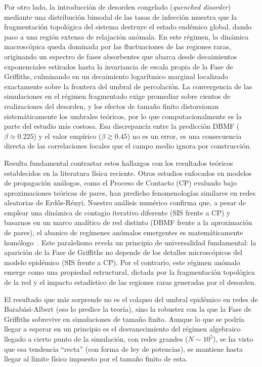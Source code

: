 \documentclass[%
reprint,
amsmath,amssymb,
aps,
]{revtex4-2}
\begin{document}
	Por otro lado, la introducción de desorden congelado (\textit{quenched disorder}) mediante una distribución bimodal de las tasas de infección muestra que la fragmentación topológica del sistema destruye el estado endémico global, dando paso a una región extensa de relajación anómala. En este régimen, la dinámica macroscópica queda dominada por las fluctuaciones de las regiones raras, originando un espectro de fases absorbentes que abarca desde decaimientos exponenciales estirados hasta la invariancia de escala propia de la Fase de Griffiths, culminando en un decaimiento logarítmico marginal localizado exactamente sobre la frontera del umbral de percolación. La convergencia de las simulaciones en el régimen fragmentado exige promediar sobre cientos de realizaciones del desorden, y los efectos de tamaño finito distorsionan sistemáticamente los umbrales teóricos, por lo que computacionalmente es la parte del estudio más costosa. Esa discrepancia entre la predicción DBMF ($\beta \approx 0.225$) y el valor empírico ($\beta \gtrsim 0.45$) no es un error, es una consecuencia directa de las correlaciones locales que el campo medio ignora por construcción.
	
	Resulta fundamental contrastar estos hallazgos con los resultados teóricos establecidos en la literatura física reciente. Otros estudios enfocados en modelos de propagación análogos, como el Proceso de Contacto (CP) evaluado bajo aproximaciones teóricas de pares, han predicho fenomenologías similares en redes aleatorias de Erdős-Rényi. Nuestro análisis numérico confirma que, a pesar de emplear una dinámica de contagio iterativo diferente (SIS frente a CP) y basarnos en un marco analítico de red distinto (DBMF frente a la aproximación de pares), el abanico de regímenes anómalos emergentes es matemáticamente homólogo~\cite{Muñoz2010}. Este paralelismo revela un principio de universalidad fundamental: la aparición de la Fase de Griffiths no depende de los detalles microscópicos del modelo epidémico (SIS frente a CP). Por el contrario, este régimen anómalo emerge como una propiedad estructural, dictada por la fragmentación topológica de la red y el impacto estadístico de las regiones raras generadas por el desorden.
	
	El resultado que más sorprende no es el colapso del umbral epidémico en redes de Barabási-Albert (eso lo predice la teoría), sino la robustez con la que la Fase de Griffiths sobrevive en simulaciones de tamaño finito. Aunque lo que se podría llegar a esperar en un principio es el desvanecimiento del régimen algebraico llegado a cierto punto de la simulación, con redes grandes ($N \sim 10^5$), se ha visto que esa tendencia ``recta'' (con forma de ley de potencias), se mantiene hasta llegar al límite físico impuesto por el tamaño finito de esta.
	
\end{document}
